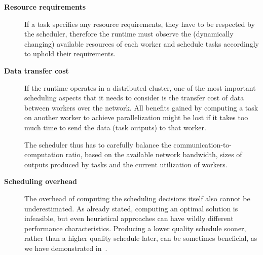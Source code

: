 \begin{description}
    \item[\textbf{Resource requirements}] If a task specifies any resource requirements, they
    have to be respected by the scheduler, therefore the runtime must observe the
    (dynamically changing) available resources of each worker and schedule tasks accordingly to
    uphold their requirements.
    \item[\textbf{Data transfer cost}] If the runtime operates in a distributed cluster, one of
    the most important scheduling aspects that it needs to consider is the transfer cost of data
    between workers over the network. All benefits gained by computing a task on another worker to
    achieve parallelization might be lost if it takes too much time to send the data (task
    outputs) to that worker.

    The scheduler thus has to carefully balance the communication-to-computation ratio, based on
    the available network bandwidth, sizes of outputs produced by tasks and the current utilization
    of workers.
    \item[\textbf{Scheduling overhead}] The overhead of computing the scheduling decisions
    itself also cannot be underestimated. As already stated, computing an optimal solution is
    infeasible, but even heuristical approaches can have wildly different performance
    characteristics. Producing a lower quality schedule sooner, rather than a higher quality
    schedule later, can be sometimes beneficial, as we have demonstrated in~\cite{rsds}.
\end{description}
